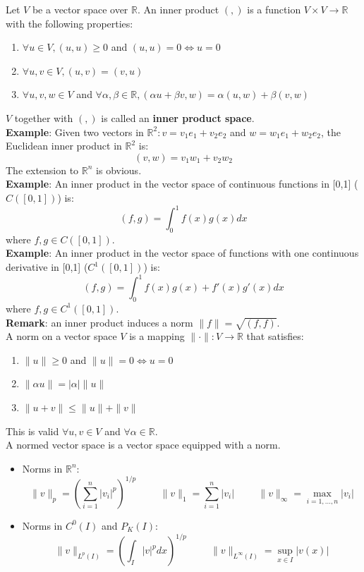 Let $V$ be a vector space over $\mathbb{R}$. An inner product $(,)$ is a function $V \times V \to \mathbb{R}$ with the following properties:
\begin{enumerate}
    \item $\forall u \in V, (u,u) \geq 0 $ and $(u,u) = 0 \iff u = 0$
    \item $\forall u,v \in V, (u,v) = (v,u)$
    \item $\forall u,v,w \in V$ and $\forall \alpha,\beta \in \mathbb{R}, (\alpha u + \beta v, w) = \alpha(u,w) + \beta(v,w)$
\end{enumerate}
$V$ together with $(,)$ is called an \textbf{inner product space}.\\

\textbf{Example}: Given two vectors in $\mathbb{R}^2: v = v_1e_1 + v_2e_2$ and $w = w_1e_1 + w_2e_2$, the Euclidean inner product in $\mathbb{R}^2$ is:
\[
    (v,w) = v_1w_1 + v_2w_2     
\]
The extension to $\mathbb{R}^n$ is obvious.\\

\textbf{Example}: An inner product in the vector space of continuous functions in [0,1] ($C([0,1])$) is:
\[
    (f,g) = \int_0^1 f(x)g(x)dx    
\]
where $f,g \in C([0,1])$.\\

\textbf{Example}: An inner product in the vector space of functions with one continuous derivative in [0,1] ($C^1([0,1])$) is:
\[
    (f,g) = \int_0^1 f(x)g(x) + f'(x)g'(x)dx    
\]
where $f,g \in C^1([0,1])$.\\

\textbf{Remark}: an inner product induces a norm $\|f\| = \sqrt{(f,f)}$.\\

A norm on a vector space $V$ is a mapping $\|\cdot\|: V \to \mathbb{R}$ that satisfies:
\begin{enumerate}
    \item $\|u\| \geq 0$ and $\|u\| = 0 \iff u = 0$
    \item $\|\alpha u\| = |\alpha|\|u\|$
    \item $\|u+v\| \leq \|u\| + \|v\|$
\end{enumerate}
This is valid $\forall u,v \in V $ and $\forall \alpha \in \mathbb{R}$.\\
A normed vector space is a vector space equipped with a norm. 
\begin{itemize}
    \item Norms in $\mathbb{R}^n$:
    \[
        \|v\|_p = \left(\sum_{i=1}^{n} |v_i|^p\right)^{1/p}   \hspace{1cm} \|v\|_1 = \sum_{i=1}^{n} |v_i| \hspace{1cm} \|v\|_\infty = \max_{i=1,\dots,n} |v_i|
    \]
    \item Norms in $C^0(I)$ and $P_K(I)$:
    \[
        \|v\|_{L^p(I)} = \left(\int_I |v|^p dx\right)^{1/p}   \hspace{1cm} \|v\|_{L^{\infty}(I)} = \sup_{x \in I} |v(x)| 
    \]
\end{itemize}

